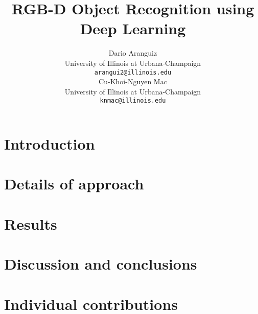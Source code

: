 \documentclass{article} %
\title{RGB-D Object Recognition using Deep Learning}
\author{
Dario Aranguiz \\
University of Illinois at Urbana-Champaign \\
\texttt{arangui2@illinois.edu} \\
\And
Cu-Khoi-Nguyen Mac \\
University of Illinois at Urbana-Champaign \\
\texttt{knmac@illinois.edu} \\
}
\begin{document}
\maketitle

\begin{abstract}

\end{abstract}

\section{Introduction}



\section{Details of approach}



\section{Results}



\section{Discussion and conclusions}



\section{Individual contributions}





\end{document}

